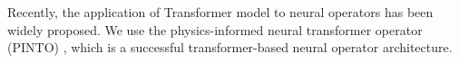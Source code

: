 
Recently, the application of Transformer model to neural operators has been widely proposed. 
\cite{BENO,Transolver}
We use the physics-informed neural transformer operator (PINTO) 
\cite{PINTO}, which is a successful transformer-based neural operator architecture.


